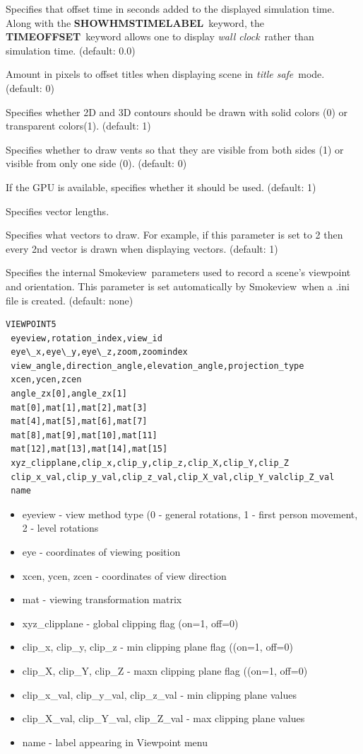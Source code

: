 \documentclass[11pt,twoside]{book}
\newcommand{\smokeview}{{Smokeview}}
\newcommand{\hitem}[1]{\item[{\bf #1} \hfill]}
\begin{document}
\hitem{TIMEOFFSET} Specifies that offset time in seconds added to
the displayed simulation time.  Along with the {\bf
SHOWHMSTIMELABEL}\ keyword, the {\bf TIMEOFFSET}\ keyword allows
one to display {\em wall clock}\ rather than simulation time.
(default: 0.0)

\hitem{TITLESAFE}Amount in pixels to offset titles when displaying
scene in {\em title safe}\ mode.   (default: 0)

\hitem{TRANSPARENT}Specifies whether 2D and 3D contours should be
drawn with solid colors (0) or transparent colors(1). (default: 1)

\hitem{TWOSIDEDVENTS}  Specifies whether to draw vents so that they are visible from
both sides (1) or visible from only one side (0).  (default: 0)

\hitem{USEGPU} If the GPU is available, specifies whether it should be used. (default: 1)


\hitem{VECLENGTH} Specifies vector lengths.

\hitem{VECTORSKIP}Specifies
what vectors to draw.  For example, if this parameter is set to 2 then
every 2nd vector is drawn when displaying vectors.
(default: 1)

\hitem{VIEWPOINT5}Specifies the internal \smokeview\ parameters used to
record a scene's viewpoint and orientation.  This parameter is set automatically
by \smokeview\ when a .ini file is created.
(default: none)

{\small
\begin{verbatim}
VIEWPOINT5
 eyeview,rotation_index,view_id
 eye\_x,eye\_y,eye\_z,zoom,zoomindex
 view_angle,direction_angle,elevation_angle,projection_type
 xcen,ycen,zcen
 angle_zx[0],angle_zx[1]
 mat[0],mat[1],mat[2],mat[3]
 mat[4],mat[5],mat[6],mat[7]
 mat[8],mat[9],mat[10],mat[11]
 mat[12],mat[13],mat[14],mat[15]
 xyz_clipplane,clip_x,clip_y,clip_z,clip_X,clip_Y,clip_Z
 clip_x_val,clip_y_val,clip_z_val,clip_X_val,clip_Y_valclip_Z_val
 name
\end{verbatim}
}

\begin{itemize}
\item eyeview - view method type (0 - general rotations, 1 - first person movement, 2 - level rotations
\item eye - coordinates of viewing position
\item xcen, ycen, zcen - coordinates of view direction
\item mat - viewing transformation matrix
\item xyz\_clipplane - global clipping flag (on=1, off=0)
\item clip\_x, clip\_y, clip\_z - min clipping plane flag ((on=1, off=0)
\item clip\_X, clip\_Y, clip\_Z - maxn clipping plane flag ((on=1, off=0)
\item clip\_x\_val, clip\_y\_val, clip\_z\_val - min clipping plane values
\item clip\_X\_val, clip\_Y\_val, clip\_Z\_val - max clipping plane values
\item name - label appearing in Viewpoint menu
\end{itemize}
\end{document}
